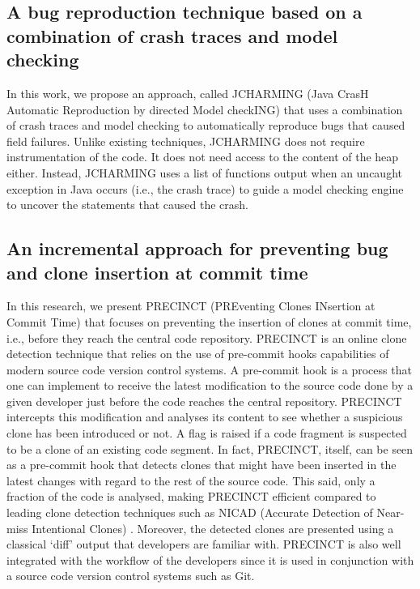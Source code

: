 \subsection{A bug reproduction technique based on a combination of crash traces and model checking}

In this work, we propose an approach, called JCHARMING (Java CrasH Automatic Reproduction by directed Model checkING) that uses a combination of crash traces and model checking to automatically reproduce bugs that caused field failures.
Unlike existing techniques, JCHARMING does not require instrumentation of the code.
It does not need access to the content of the heap either.
Instead, JCHARMING uses a list of functions output when an uncaught exception in Java occurs (i.e., the crash trace) to guide a model checking engine to uncover the statements that caused the crash.

\subsection{An incremental approach for preventing bug and clone insertion at commit time}
In this research, we present PRECINCT (PREventing Clones INsertion at Commit Time) that focuses on preventing the
insertion of clones at commit time, i.e., before they reach the central code repository.
PRECINCT is an online clone
detection technique that relies on the use of pre-commit hooks capabilities of modern source code version control systems.
A pre-commit hook is a process that one can implement to receive the latest modification to the source code done by a given developer just before the code reaches the central repository.
PRECINCT intercepts this modification and analyses its content to see whether a suspicious clone has been introduced
or not.
A flag is raised if a code fragment is suspected to be a clone of an existing code segment.
In fact, PRECINCT, itself, can be seen as a pre-commit hook that detects clones that might have been inserted in the latest changes with regard to the rest of the source code.
This said, only a fraction of the
code is analysed, making PRECINCT efficient compared to leading clone detection techniques such as NICAD (Accurate Detection of Near-miss Intentional Clones) \cite{Roy2008,Cordy2011}.
Moreover, the detected clones are presented using a classical ‘diff’ output that developers are familiar with.
PRECINCT is also well
integrated with the workflow of the developers since it is used in conjunction with a source code version control systems such as Git.

